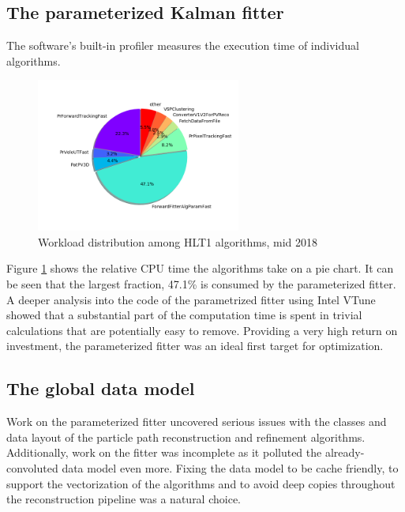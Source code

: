 \documentclass[12pt]{article}
\begin{document}
\subsection{The parameterized Kalman fitter}

The software's built-in profiler measures the execution time of individual algorithms.

\begin{figure}[H]
	\begin{center}
		\includegraphics[width=0.6\textwidth]{algo_usage_original_bestphys}
	\end{center}
	\caption{Workload distribution among HLT1 algorithms, mid 2018}
	\label{fig_algo_usage_choice}
\end{figure}

Figure \ref{fig_algo_usage_choice} shows the relative CPU time the algorithms take on a pie chart. It can be seen that the largest fraction, 47.1\% is consumed by the parameterized fitter. A deeper analysis into the code of the parametrized fitter using Intel VTune showed that a substantial part of the computation time is spent in trivial calculations that are potentially easy to remove. Providing a very high return on investment, the parameterized fitter was an ideal first target for optimization.


\subsection{The global data model}

Work on the parameterized fitter uncovered serious issues with the classes and data layout of the particle path reconstruction and refinement algorithms. Additionally, work on the fitter was incomplete as it polluted the already-convoluted data model even more. Fixing the data model to be cache friendly, to support the vectorization of the algorithms and to avoid deep copies throughout the reconstruction pipeline was a natural choice.
\end{document}
